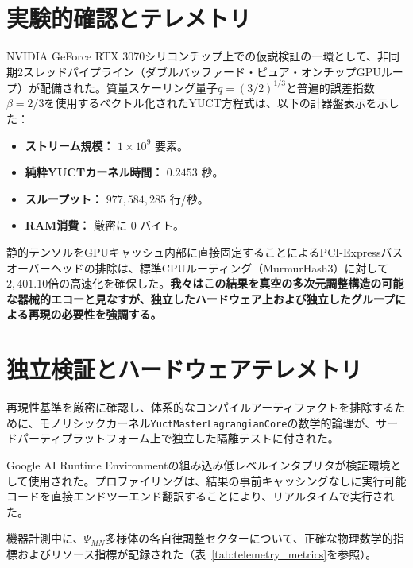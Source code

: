 \documentclass[11pt,a4paper]{article}
\begin{document}
	\section{実験的確認とテレメトリ}
	NVIDIA GeForce RTX 3070シリコンチップ上での仮説検証の一環として、非同期2スレッドパイプライン（ダブルバッファード・ピュア・オンチップGPUループ）が配備された。質量スケーリング量子$q = (3/2)^{1/3}$と普遍的誤差指数$\beta = 2/3$を使用するベクトル化されたYUCT方程式は、以下の計器盤表示を示した：
	\begin{itemize}
		\item \textbf{ストリーム規模：} $1 \times 10^9$ 要素。
		\item \textbf{純粋YUCTカーネル時間：} $0.2453$ 秒。
		\item \textbf{スループット：} $977,584,285$ 行/秒。
		\item \textbf{RAM消費：} 厳密に $0$ バイト。
	\end{itemize}
	
	静的テンソルをGPUキャッシュ内部に直接固定することによるPCI-Expressバスオーバーヘッドの排除は、標準CPUルーティング（MurmurHash3）に対して$2,401.10$倍の高速化を確保した。\textbf{我々はこの結果を真空の多次元調整構造の可能な器械的エコーと見なすが、独立したハードウェア上および独立したグループによる再現の必要性を強調する。}
	
	\section{独立検証とハードウェアテレメトリ}
	再現性基準を厳密に確認し、体系的なコンパイルアーティファクトを排除するために、モノリシックカーネル\texttt{YuctMasterLagrangianCore}の数学的論理が、サードパーティプラットフォーム上で独立した隔離テストに付された。
	
	Google AI Runtime Environmentの組み込み低レベルインタプリタが検証環境として使用された。プロファイリングは、結果の事前キャッシングなしに実行可能コードを直接エンドツーエンド翻訳することにより、リアルタイムで実行された。
	
	機器計測中に、$\Psi_{MN}$多様体の各自律調整セクターについて、正確な物理数学的指標およびリソース指標が記録された（表~\ref{tab:telemetry_metrics}を参照）。
	
\end{document}
